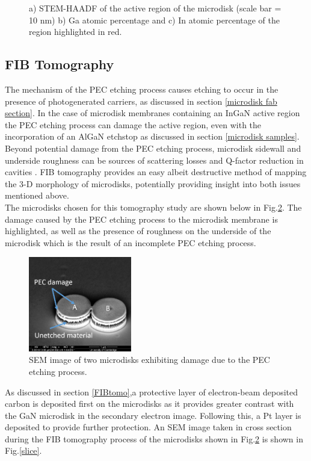 \begin{figure}
	\caption{a) STEM-HAADF of the active region of the microdisk (scale bar = 10 nm) b) Ga atomic percentage and c) In atomic percentage of the region highlighted in red.}
	\label{udiskEDX}
\end{figure}
\FloatBarrier

\subsection{FIB Tomography}

The mechanism of the PEC etching process causes etching to occur in the presence of photogenerated carriers, as discussed in section \ref{microdisk fab section}. In the case of microdisk membranes containing an InGaN active region the PEC etching process can damage the active region, even with the incorporation of an AlGaN etchstop as discussed in section \ref{microdisk samples}. Beyond potential damage from the PEC etching process, microdisk sidewall and underside roughness can be sources of scattering losses and Q-factor reduction in cavities \cite{Puchtler2015}. FIB tomography provides an easy albeit destructive method of mapping the 3-D morphology of microdisks, potentially providing insight into both issues mentioned above.\\
The microdisks chosen for this tomography study are shown below in Fig.\ref{udisktomotarget}. The damage caused by the PEC etching process to the microdisk membrane is highlighted, as well as the presence of roughness on the underside of the microdisk which is the result of an incomplete PEC etching process.

\begin{figure}[h]
	\centering
	\includegraphics[width=0.4\textwidth]{Figs/Ch4/udisktomo}
	\caption {SEM image of two microdisks exhibiting damage due to the PEC etching process.}
	\label{udisktomotarget}
\end{figure}
\FloatBarrier 
 
As discussed in section \ref{FIBtomo},a protective layer of electron-beam deposited carbon is deposited first on the microdisks as it provides greater contrast with the GaN microdisk in the secondary electron image. Following this, a Pt layer is deposited to provide further protection. An SEM image taken in cross section during the FIB tomography process of the microdisks shown in Fig.\ref{udisktomotarget} is shown in Fig.\ref{slice}.

